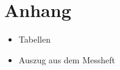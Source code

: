 \documentclass[11pt,ngerman,a4paper]{article}
\begin{document}
\section{Anhang}
\begin{itemize}
\item Tabellen
\item Auszug aus dem Messheft


\end{itemize}

\newpage
\end{document}
